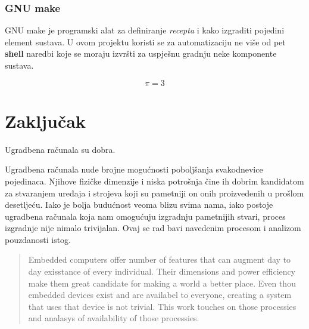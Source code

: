 \documentclass[times, utf8, diplomski]{diplomski}
\begin{document}
\subsection{GNU make}
GNU make je programski alat za definiranje \textit{recepta} i kako izgraditi pojedini element sustava. U ovom projektu koristi se za automatizaciju ne više od pet \textbf{shell} naredbi koje se moraju izvršti za uspješnu gradnju neke komponente sustava.

\begin{equation}
  \pi=3
\end{equation}

\chapter{Zaključak}
Ugradbena računala su dobra.

\nocite{*}



\lstlistoflistings

\begin{sazetak}
Ugradbena računala nude brojne mogućnosti poboljšanja svakodnevice pojedinaca. Njihove fizičke dimenzije i niska potrošnja čine ih dobrim kandidatom za stvaranjem uređaja i strojeva koji su pametniji on onih proizvedenih u prošlom desetljeću. Iako je bolja budućnost veoma blizu svima nama, iako postoje ugradbena računala koja nam omogućuju izgradnju pametnijih stvari, proces izgradnje nije nimalo trivijalan. Ovaj se rad bavi navedenim procesom i analizom pouzdanosti istog.

\end{sazetak}


\begin{abstract}
Embedded computers offer number of features that can augment day to day exisstance of every individual. Their dimensions and power efficiency make them great candidate for making a world a better place. Even thou embedded devices exist and are availabel to everyone, creating a system that uses that device is not trivial. This work touches on those processies and analasys of availability of those processies.

\end{abstract}
\end{document}
